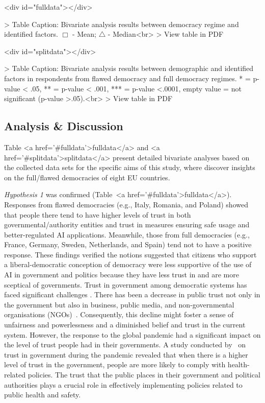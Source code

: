 \documentclass[
]{ceurart}
\begin{document}
 \begin{table}<div id="fulldata"></div>

> Table Caption: Bivariate analysis results between democracy regime and identified factors. $\Box$ - Mean; $\bigtriangleup$ - Median<br>
> View table in PDF
\end{table}


 \begin{table}<div id="splitdata"></div>

> Table Caption: Bivariate analysis results between demographic and identified factors in respondents from flawed democracy and full democracy regimes. * = p-value < .05, ** = p-value < .001, *** = p-value <.0001, empty value = not significant (p-value >.05).<br>
> View table in PDF
\end{table}

\subsection{Analysis \& Discussion}
Table <a href='#fulldata'>fulldata</a> and <a href='#splitdata'>splitdata</a> present detailed bivariate analyses based on the collected data sets for the specific aims of this study, where discover insights on the full/flawed democracies of eight EU countries.

\textit{Hypothesis 1} was confirmed (Table~<a href='#fulldata'>fulldata</a>). Responses from flawed democracies (e.g., Italy, Romania, and Poland) showed that people there tend to have higher levels of trust in both governmental/authority entities and trust in measures ensuring safe usage and better-regulated AI applications. Meanwhile, those from full democracies (e.g., France, Germany, Sweden, Netherlands, and Spain) tend not to have a positive response. These findings verified the notions suggested that citizens who support a liberal-democratic conception of democracy were less supportive of the use of AI in government and politics \cite{konig2022citizen} because they have less trust in and are more sceptical of governments. Trust in government among democratic systems has faced significant challenges \cite{geana2011health}. There has been a decrease in public trust not only in the government but also in business, public media, and non-governmental organisations (NGOs)~\cite{geana2011health}. Consequently, this decline might foster a sense of unfairness and powerlessness and a diminished belief and trust in the current system. However, the response to the global pandemic had a significant impact on the level of trust people had in their governments. A study conducted 
by~\cite{groeniger2021dutch} on trust in government during the pandemic revealed that when there is a higher level of trust in the government, people are more likely to comply with health-related policies. The trust that the public places in their government and political authorities plays a crucial role in effectively implementing policies related to public health and safety.
\end{document}
